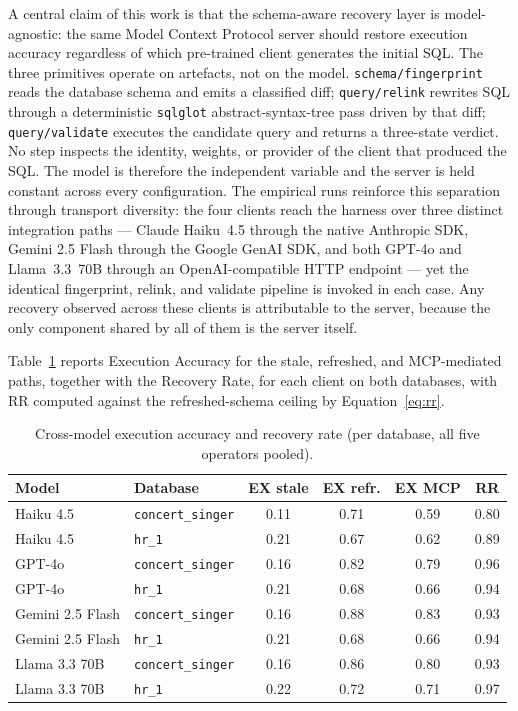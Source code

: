 \documentclass[conference,10pt,a4paper]{IEEEtran}
\begin{document}
A central claim of this work is that the schema-aware recovery layer is
model-agnostic: the same Model Context Protocol server should restore
execution accuracy regardless of which pre-trained client generates the
initial SQL. The three primitives operate on artefacts, not on the
model. \texttt{schema/fingerprint} reads the database schema and emits
a classified diff; \texttt{query/relink} rewrites SQL through a
deterministic \texttt{sqlglot} abstract-syntax-tree pass driven by
that diff; \texttt{query/validate} executes the candidate query and
returns a three-state verdict. No step inspects the identity, weights,
or provider of the client that produced the SQL. The model is
therefore the independent variable and the server is held constant
across every configuration. The empirical runs reinforce this separation through
transport diversity: the four clients reach the harness over three distinct
integration paths --- Claude Haiku~4.5 through the native Anthropic SDK,
Gemini 2.5 Flash through the Google GenAI SDK, and both GPT-4o and
Llama~3.3~70B through an OpenAI-compatible HTTP endpoint --- yet the identical
fingerprint, relink, and validate pipeline is invoked in each case. Any
recovery observed across these clients is attributable to the server,
because the only component shared by all of them is the server itself.

Table~\ref{tab:crossmodel} reports Execution Accuracy for the stale,
refreshed, and MCP-mediated paths, together with the Recovery Rate, for
each client on both databases, with RR computed against the
refreshed-schema ceiling by Equation~\ref{eq:rr}.

\begin{table}[t]
\centering
\footnotesize
\caption{Cross-model execution accuracy and recovery rate (per database,
all five operators pooled).}
\label{tab:crossmodel}
\begin{tabular}{llcccc}
\toprule
\textbf{Model} & \textbf{Database} & \textbf{EX stale} & \textbf{EX refr.} & \textbf{EX MCP} & \textbf{RR} \\
\midrule
Haiku 4.5  & \texttt{concert\_singer} & 0.11 & 0.71 & 0.59 & 0.80 \\
Haiku 4.5  & \texttt{hr\_1}           & 0.21 & 0.67 & 0.62 & 0.89 \\
GPT-4o     & \texttt{concert\_singer} & 0.16 & 0.82 & 0.79 & 0.96 \\
GPT-4o     & \texttt{hr\_1}           & 0.21 & 0.68 & 0.66 & 0.94 \\
Gemini 2.5 Flash & \texttt{concert\_singer} & 0.16 & 0.88 & 0.83 & 0.93 \\
Gemini 2.5 Flash & \texttt{hr\_1}           & 0.21 & 0.68 & 0.66 & 0.94 \\
Llama 3.3 70B    & \texttt{concert\_singer} & 0.16 & 0.86 & 0.80 & 0.93 \\
Llama 3.3 70B    & \texttt{hr\_1}           & 0.22 & 0.72 & 0.71 & 0.97 \\
\bottomrule
\end{tabular}
\end{table}
\end{document}
